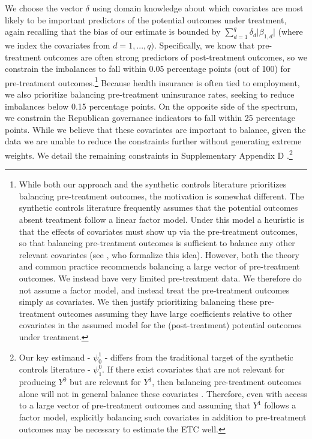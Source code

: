 \documentclass[aoas]{imsart}
\theoremstyle{plain}
\theoremstyle{remark}
\begin{document}
We choose the vector $\delta$ using domain knowledge about which covariates are most likely to be important predictors of the potential outcomes under treatment, again recalling that the bias of our estimate is bounded by $\sum_{d=1}^q \delta_d \lvert \beta_{1,d} \rvert$ (where we index the covariates from $d = 1, ..., q)$. Specifically, we know that pre-treatment outcomes are often strong predictors of post-treatment outcomes, so we constrain the imbalances to fall within 0.05 percentage points (out of 100) for pre-treatment outcomes.\footnote{While both our approach and the synthetic controls literature prioritizes balancing pre-treatment outcomes, the motivation is somewhat different. The synthetic controls literature frequently assumes that the potential outcomes absent treatment follow a linear factor model. Under this model a heuristic is that the effects of covariates must show up via the pre-treatment outcomes, so that balancing pre-treatment outcomes is sufficient to balance any other relevant covariates (see \citet{botosaru2019role}, who formalize this idea). However, both the theory and common practice recommends balancing a large vector of pre-treatment outcomes. We instead have very limited pre-treatment data. We therefore do not assume a factor model, and instead treat the pre-treatment outcomes simply as covariates. We then justify prioritizing balancing these pre-treatment outcomes assuming they have large coefficients relative to other covariates in the assumed model for the (post-treatment) potential outcomes under treatment.} Because health insurance is often tied to employment, we also prioritize balancing pre-treatment uninsurance rates, seeking to reduce imbalances below 0.15 percentage points. On the opposite side of the spectrum, we constrain the Republican governance indicators to fall within 25 percentage points. While we believe that these covariates are important to balance, given the data we are unable to reduce the constraints further without generating extreme weights. We detail the remaining constraints in Supplementary Appendix D \citep{supplement}.\footnote{Our key estimand - $\psi_0^1$ - differs from the traditional target of the synthetic controls literature - $\psi^0_1$. If there exist covariates that are not relevant for producing $Y^0$ but are relevant for $Y^1$, then balancing pre-treatment outcomes alone will not in general balance these covariates \citep{botosaru2019role}. Therefore, even with access to a large vector of pre-treatment outcomes and assuming that $Y^1$ follows a factor model, explicitly balancing such covariates in addition to pre-treatment outcomes may be necessary to estimate the ETC well.}
\end{document}
